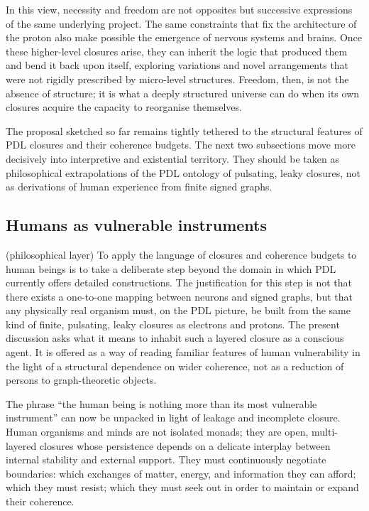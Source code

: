 \documentclass[11pt,a4paper]{article}
\theoremstyle{definition}
\begin{document}
In this view, necessity and freedom are not opposites but successive expressions of the same underlying project. The same constraints that fix the architecture of the proton also make possible the emergence of nervous systems and brains. Once these higher-level closures arise, they can inherit the logic that produced them and bend it back upon itself, exploring variations and novel arrangements that were not rigidly prescribed by micro-level structures.\cite{Laubscher_PDL_TO_Dialogue_2024} Freedom, then, is not the absence of structure; it is what a deeply structured universe can do when its own closures acquire the capacity to reorganise themselves. 

The proposal sketched so far remains tightly tethered to the structural features of PDL closures and their coherence budgets. The next two subsections move more decisively into interpretive and existential territory. They should be taken as philosophical extrapolations of the PDL ontology of pulsating, leaky closures, not as derivations of human experience from finite signed graphs.

\subsection{Humans as vulnerable instruments}

(philosophical layer) To apply the language of closures and coherence budgets to human beings is to take a deliberate step beyond the domain in which PDL currently offers detailed constructions. The justification for this step is not that there exists a one-to-one mapping between neurons and signed graphs, but that any physically real organism must, on the PDL picture, be built from the same kind of finite, pulsating, leaky closures as electrons and protons. The present discussion asks what it means to inhabit such a layered closure as a conscious agent. It is offered as a way of reading familiar features of human vulnerability in the light of a structural dependence on wider coherence, not as a reduction of persons to graph-theoretic objects.

The phrase ``the human being is nothing more than its most vulnerable instrument'' can now be unpacked in light of leakage and incomplete closure. Human organisms and minds are not isolated monads; they are open, multi-layered closures whose persistence depends on a delicate interplay between internal stability and external support.\cite{Laubscher_Existence_PulsatingClosure_2026} They must continuously negotiate boundaries: which exchanges of matter, energy, and information they can afford; which they must resist; which they must seek out in order to maintain or expand their coherence.
\end{document}
